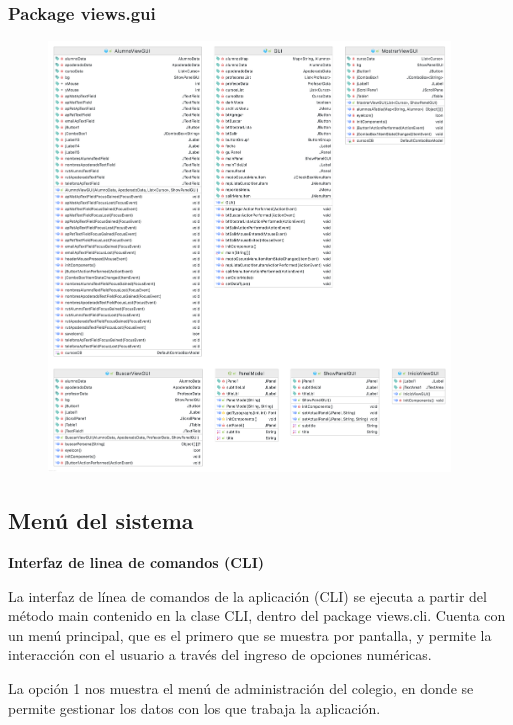 \clearpage

\subsubsection*{Package views.gui}

\begin{figure}[h]
    \centering
    \includegraphics[width=0.95\textwidth]{contents/img/paq/views.gui}
\end{figure}

\clearpage

\subsection{Menú del sistema}

\textbf{Interfaz de linea de comandos (CLI)}

La interfaz de línea de comandos de la aplicación (CLI) se ejecuta a partir del método main contenido en la clase CLI, dentro del package views.cli. Cuenta con un menú principal, que es el primero que se muestra por pantalla, y permite la interacción con el usuario a través del ingreso de opciones numéricas.


La opción 1 nos muestra el menú de administración del colegio, en donde se permite gestionar los datos con los que trabaja la aplicación.

